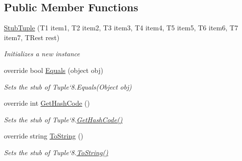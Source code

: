 \subsection*{Public Member Functions}
\begin{DoxyCompactItemize}
\item 
\hyperlink{class_system_1_1_fakes_1_1_stub_tuple_3_01_t1_00_01_t2_00_01_t3_00_01_t4_00_01_t5_00_01_t6_00_01_t7_00_01_t_rest_01_4_a193fc35ea54ff3bc2f46411be8353462}{Stub\-Tuple} (T1 item1, T2 item2, T3 item3, T4 item4, T5 item5, T6 item6, T7 item7, T\-Rest rest)
\begin{DoxyCompactList}\small\item\em Initializes a new instance\end{DoxyCompactList}\item 
override bool \hyperlink{class_system_1_1_fakes_1_1_stub_tuple_3_01_t1_00_01_t2_00_01_t3_00_01_t4_00_01_t5_00_01_t6_00_01_t7_00_01_t_rest_01_4_a74465462d2ab750c576856d0d22f62e0}{Equals} (object obj)
\begin{DoxyCompactList}\small\item\em Sets the stub of Tuple`8.Equals(\-Object obj)\end{DoxyCompactList}\item 
override int \hyperlink{class_system_1_1_fakes_1_1_stub_tuple_3_01_t1_00_01_t2_00_01_t3_00_01_t4_00_01_t5_00_01_t6_00_01_t7_00_01_t_rest_01_4_aae6e7f5ad603618382c370ddc3ea8c81}{Get\-Hash\-Code} ()
\begin{DoxyCompactList}\small\item\em Sets the stub of Tuple`8.\hyperlink{class_system_1_1_fakes_1_1_stub_tuple_3_01_t1_00_01_t2_00_01_t3_00_01_t4_00_01_t5_00_01_t6_00_01_t7_00_01_t_rest_01_4_aae6e7f5ad603618382c370ddc3ea8c81}{Get\-Hash\-Code()}\end{DoxyCompactList}\item 
override string \hyperlink{class_system_1_1_fakes_1_1_stub_tuple_3_01_t1_00_01_t2_00_01_t3_00_01_t4_00_01_t5_00_01_t6_00_01_t7_00_01_t_rest_01_4_af267b4c3ec9efe8c69e768b31e20ca13}{To\-String} ()
\begin{DoxyCompactList}\small\item\em Sets the stub of Tuple`8.\hyperlink{class_system_1_1_fakes_1_1_stub_tuple_3_01_t1_00_01_t2_00_01_t3_00_01_t4_00_01_t5_00_01_t6_00_01_t7_00_01_t_rest_01_4_af267b4c3ec9efe8c69e768b31e20ca13}{To\-String()}\end{DoxyCompactList}\end{DoxyCompactItemize}
